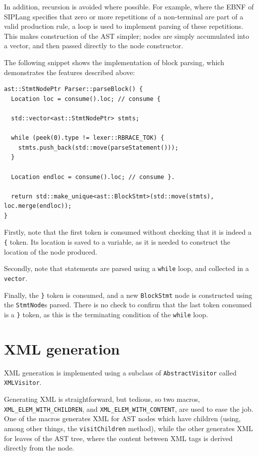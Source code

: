 \documentclass[11pt,a4paper]{scrartcl}
\begin{document}
In addition, recursion is avoided where possible. For example, where the EBNF of SIPLang specifies that zero or more repetitions of a non-terminal are part of a valid production rule, a loop is used to implement parsing of these repetitions. This makes construction of the AST simpler; nodes are simply accumulated into a vector, and then passed directly to the node constructor.

The following snippet shows the implementation of block parsing, which demonstrates the features described above:

\begin{verbatim}
ast::StmtNodePtr Parser::parseBlock() {
  Location loc = consume().loc; // consume {

  std::vector<ast::StmtNodePtr> stmts;

  while (peek(0).type != lexer::RBRACE_TOK) {
    stmts.push_back(std::move(parseStatement()));
  }

  Location endloc = consume().loc; // consume }.

  return std::make_unique<ast::BlockStmt>(std::move(stmts), loc.merge(endloc));
}
\end{verbatim}

Firstly, note that the first token is consumed without checking that it is indeed a \verb!{! token. Its location is saved to a variable, as it is needed to construct the location of the node produced.

Secondly, note that statements are parsed using a \verb!while! loop, and collected in a \verb!vector!.

Finally, the \verb!}! token is consumed, and a new \verb!BlockStmt! node is constructed using the \verb!StmtNode!s parsed. There is no check to confirm that the last token consumed is a \verb!}! token, as this is the terminating condition of the \verb!while! loop.

\newpage

\section{XML generation}

XML generation is implemented using a subclass of \verb!AbstractVisitor! called \verb!XMLVisitor!.

Generating XML is straightforward, but tedious, so two macros, \verb!XML_ELEM_WITH_CHILDREN!, and \verb!XML_ELEM_WITH_CONTENT!, are used to ease the job. One of the macros generates XML for AST nodes which have children (using, among other things, the \verb!visitChildren! method), while the other generates XML for leaves of the AST tree, where the content between XML tags is derived directly from the node.
\end{document}

